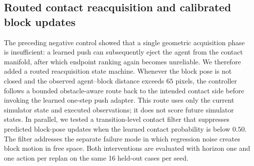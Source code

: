 \documentclass{article}
\begin{document}
\subsection{Routed contact reacquisition and calibrated block updates}
\label{sec:supp-learned-contact-repair}

The preceding negative control showed that a single geometric acquisition
phase is insufficient: a learned push can subsequently eject the agent from
the contact manifold, after which endpoint ranking again becomes unreliable.
We therefore added a routed reacquisition state machine. Whenever the block
pose is not closed and the observed agent--block distance exceeds $65$ pixels,
the controller follows a bounded obstacle-aware route back to the intended
contact side before invoking the learned one-step push adapter. This route
uses only the current simulator state and executed observations; it does not
score future simulator states. In parallel, we tested a transition-level
contact filter that suppresses predicted block-pose updates when the learned
contact probability is below $0.50$. The filter addresses the separate failure
mode in which regression noise creates block motion in free space. Both
interventions are evaluated with horizon one and one action per replan on the
same 16 held-out cases per seed.

\begin{table}[H]
\centering
\scriptsize
\setlength{\tabcolsep}{3pt}
\caption{Routed contact reacquisition and calibrated block-update ablation.
Values are means over two seeds and 16 matched cases. The contact filter is applied
inside the learned candidate rollout; ``route'' counts contact-route entries,
including reacquisition.}
\label{tab:supp-learned-contact-repair}
\end{table}
\end{document}
